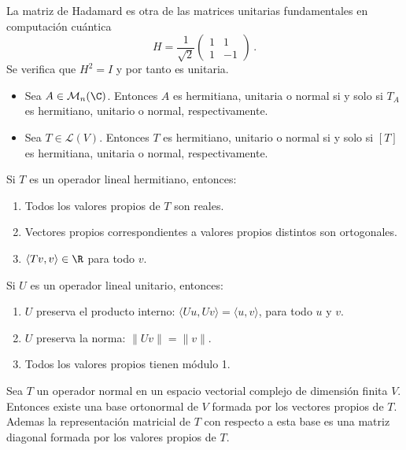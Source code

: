 \begin{eje}
  La matriz de Hadamard es otra de las matrices unitarias fundamentales en computación cuántica
  \[
    H = \frac{1}{\sqrt{2}}\begin{pmatrix} 1 & 1 \\ 1 & -1 \end{pmatrix}\,.
  \]
  Se verifica que $H^2 = I$ y por tanto es unitaria.
\end{eje}


\begin{prop}
  \begin{itemize}
    \item Sea $A \in \mathcal{M}_n(\C)$. Entonces $A$ es hermitiana, unitaria o normal si y solo si $T_A$ es hermitiano, unitario o normal, respectivamente.
    \item Sea $T \in \mathcal{L}(V)$. Entonces $T$ es hermitiano, unitario o normal si y solo si $[T]$ es hermitiana, unitaria o normal, respectivamente.
  \end{itemize}
\end{prop}


\begin{prop}
  Si $T$ es un operador lineal hermitiano, entonces:
  \begin{enumerate}
    \item Todos los valores propios de $T$ son reales.
    \item Vectores propios correspondientes a valores propios distintos son ortogonales.
    \item $\langle Tv, v \rangle \in \R$ para todo $v$.
  \end{enumerate}
\end{prop}

\begin{prop}
  Si $U$ es un operador lineal unitario, entonces:
  \begin{enumerate}
    \item $U$ preserva el producto interno: $\langle Uu, Uv \rangle = \langle u, v \rangle$, para todo $u$ y $v$.
    \item $U$ preserva la norma: $\|Uv\| = \|v\|$.
    \item Todos los valores propios tienen módulo 1.
  \end{enumerate}
\end{prop}

\begin{theo}
  Sea $T$ un operador normal en un espacio vectorial complejo de dimensión finita $V$.  Entonces existe una base ortonormal de $V$ formada por los vectores propios de $T$. Ademas la representación matricial de $T$ con respecto a esta base es una matriz diagonal formada por los valores propios de $T$.
\end{theo}

